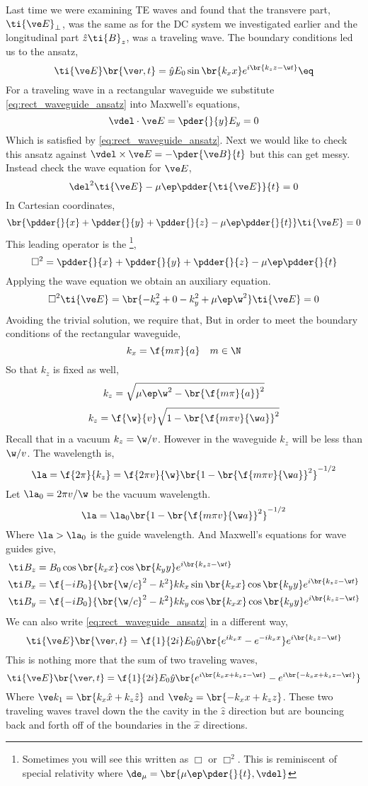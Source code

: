 \documentclass{article}
\begin{document}
Last time we were examining TE waves and found that the transvere part, $\ti{\ve E}_{\perp}$, was the same as for the DC system we investigated earlier and the longitudinal part $\hat z \ti{B}_z$, was a traveling wave. The boundary conditions led us to the ansatz,
\[ \ti{\ve E}\br{\ve r, t} = \hat y E_0 \sin\br{k_x x} e^{i\br{k_z z - \w t}} \eq \label{eq:rect_waveguide_ansatz}\]
For a traveling wave in a rectangular waveguide we substitute \cref{eq:rect_waveguide_ansatz} into Maxwell's equations,
\[ \vdel \cdot \ve E = \pder{}{y}E_y = 0 \]
Which is satisfied by \cref{eq:rect_waveguide_ansatz}. Next we would like to check this ansatz against $\vdel \times \ve E = - \pder{\ve B}{t}$ but this can get messy. Instead check the wave equation for $\ve E$,
\[ \del^2 \ti{\ve E} - \mu \ep \pdder{\ti{\ve E}}{t} = 0 \]
In Cartesian coordinates,
\[ \br{\pdder{}{x} + \pdder{}{y} + \pdder{}{z} - \mu \ep \pdder{}{t}}\ti{\ve E} = 0 \]
This leading operator is the \footnote{Sometimes you will see this written as $\Box$ or $\Box^2$. This is reminiscent of special relativity where $\de_\mu = \br{\mu \ep \pder{}{t}, \vdel}$},
\[ \Box^2 = \pdder{}{x} + \pdder{}{y} + \pdder{}{z} - \mu \ep \pdder{}{t} \]
Applying the wave equation we obtain an auxiliary equation.
\[ \Box^2 \ti{\ve E} = \br{- k_x^2 + 0 - k_y^2 + \mu \ep \w^2} \ti{\ve E} = 0 \]
Avoiding the trivial solution, we require that,
But in order to meet the boundary conditions of the rectangular waveguide,
\[ k_x = \f{m \pi}{a} \quad m \in \N \]
So that $k_z$ is fixed as well,
\[ k_z = \sqrt{\mu \ep \w^2 - \br{\f{m \pi}{a}}^2} \]
\[ k_z = \f{\w}{v}\sqrt{1 - \br{\f{m \pi v}{\w a}}^2} \]
Recall that in a vacuum $k_z = \w/ v$. However in the waveguide $k_z$ will be less than $\w / v$. The wavelength is,
\[ \la = \f{2 \pi}{k_z} = \f{2 \pi v}{\w}\br{1 - \br{\f{m \pi v}{\w a}}^2}^{-1/2} \]
Let $\la_0 = 2 \pi v/ \w$ be the vacuum wavelength.
\[ \la = \la_0\br{1 - \br{\f{m \pi v}{\w a}}^2}^{-1/2} \]
Where $\la > \la_0$ is the guide wavelength. And Maxwell's equations for wave guides give,
\begin{align*}
\ti B_z &= B_0 \cos \br{k_x x} \cos\br{k_y y} e^{i\br{k_z z - \w t}} \\
\ti B_x &= \f{-iB_0}{\br{\w/c}^2 - k^2} k k_x \sin \br{k_x x} \cos\br{k_y y} e^{i\br{k_z z - \w t}} \\
\ti B_y &= \f{-iB_0}{\br{\w/c}^2 - k^2} k k_y \cos \br{k_x x} \cos\br{k_y y} e^{i\br{k_z z - \w t}}
\end{align*}
We can also write \cref{eq:rect_waveguide_ansatz} in a different way,
\[ \ti{\ve E}\br{\ve r, t} = \f{1}{2i} E_0 \hat y \br{e^{ik_x x} - e^{-ik_x x}} e^{i \br{k_z z - \w t}} \]
This is nothing more that the sum of two traveling waves,
\[ \ti{\ve E}\br{\ve r, t} = \f{1}{2i} E_0 \hat y \br{e^{i\br{k_x x + k_z z - \w t}} - e^{i\br{-k_x x + k_z z - \w t}}} \]
Where $\ve k_1 = \br{k_x \hat x + k_z \hat z}$ and $\ve k_2 = \br{- k_x x + k_z z}$. These two traveling waves travel down the the cavity in the $\hat z$ direction but are bouncing back and forth off of the boundaries in the $\hat x$ directions.
\end{document}
